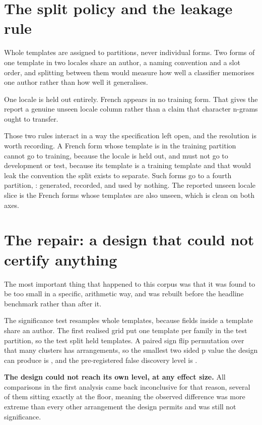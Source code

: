 \section{The split policy and the leakage rule}

Whole templates are assigned to partitions, never individual forms. Two forms of
one template in two locales share an author, a naming convention and a slot
order, and splitting between them would measure how well a classifier memorises
one author rather than how well it generalises.

One locale is held out entirely. French appears in no training form. That gives
the report a genuine unseen locale column rather than a claim that character
n-grams ought to transfer.

Those two rules interact in a way the specification left open, and the
resolution is worth recording. A French form whose template is in the training
partition cannot go to training, because the locale is held out, and must not go
to development or test, because its template is a training template and that
would leak the convention the split exists to separate. Such forms go to a
fourth partition, : generated, recorded, and used by nothing. The
reported unseen locale slice is the French forms whose templates are also
unseen, which is clean on both axes.

\section{The repair: a design that could not certify anything}

The most important thing that happened to this corpus was that it was found to
be too small in a specific, arithmetic way, and was rebuilt before the headline
benchmark rather than after it.

The significance test resamples whole templates, because fields inside a
template share an author. The first realised grid put one template per family in
the test partition, so the test split held \vOldClusters{} templates. A paired
sign flip permutation over that many clusters has \vOldArrangements{}
arrangements, so the smallest two sided p value the design can produce is
\vOldMinAttainableP{}, and the pre-registered false discovery level is
\vAlpha{}.

\textbf{The design could not reach its own level, at any effect size.} All
\vOldFamilySize{} comparisons in the first analysis came back inconclusive for
that reason, several of them sitting exactly at the floor, meaning the observed
difference was more extreme than every other arrangement the design permits and
was still not significance.

